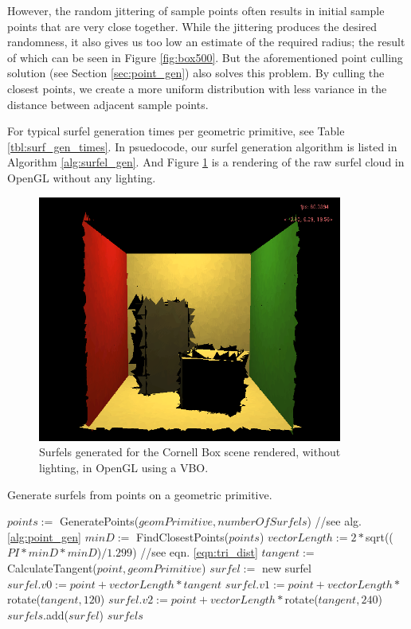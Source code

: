 However, the random jittering of sample points often results in initial sample points that are very close together. While the jittering produces the desired randomness, it also gives us too low an estimate of the required radius; the result of which can be seen in Figure \ref{fig:box500}. But the aforementioned point culling solution (see Section \ref{sec:point_gen}) also solves this problem. By culling the closest points, we create a more uniform distribution with less variance in the distance between adjacent sample points.

For typical surfel generation times per geometric primitive, see Table \ref{tbl:surf_gen_times}. In psuedocode, our surfel generation algorithm is listed in Algorithm \ref{alg:surfel_gen}. And Figure \ref{fig:surfel_cloud_simple} is a rendering of the raw surfel cloud in OpenGL without any lighting.

\begin{figure}
   \centering
   \includegraphics[width=100mm]{../img/surfel_cloud_simple.png}
   \captionfonts
   \caption[OpenGL Cornell Box surfel cloud]{Surfels generated for the Cornell Box scene rendered, without lighting, in OpenGL using a VBO.}
   \label{fig:surfel_cloud_simple}
\end{figure}

\begin{algorithm}[H]
\captionfont
\caption[Surfel generation]{Generate surfels from points on a geometric primitive.}
\label{alg:surfel_gen}
{\fontsize{10}{9}\selectfont
\begin{algorithmic}
      \State $points :=$ GeneratePoints($geomPrimitive, numberOfSurfels$) //see alg. \ref{alg:point_gen}
      \State $minD :=$ FindClosestPoints($points$)
      \State $vectorLength := 2 * $sqrt(($PI * minD * minD$)$ / 1.299$) //see eqn. \ref{eqn:tri_dist}
         \State $tangent :=$ CalculateTangent($point, geomPrimitive$)
         \State $surfel :=$ new surfel
         \State $surfel.v0 := point + vectorLength * tangent$
         \State $surfel.v1 := point + vectorLength * $rotate($tangent, 120$)
         \State $surfel.v2 := point + vectorLength * $rotate($tangent, 240$)
         \State $surfels$.add($surfel$)
      \EndFor
      \State \Return $surfels$
   \EndFunction
\end{algorithmic}
}
\end{algorithm}

